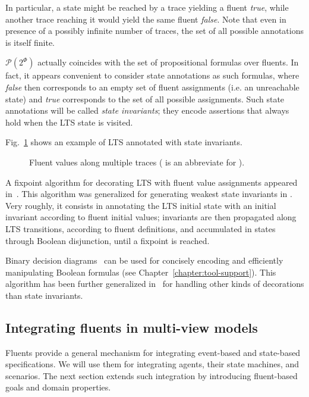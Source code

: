 In particular, a state might be reached by a trace yielding a fluent \emph{true}, while another trace reaching it would yield the same fluent \emph{false}. Note that even in presence of a possibly infinite number of traces, the set of all possible annotations is itself finite. 

$\mathcal{P}(2^\Phi)$ actually coincides with the set of propositional formulas over fluents. In fact, it appears convenient to consider state annotations as such formulas, where \emph{false} then corresponds to an empty set of fluent assignments (i.e. an unreachable state) and \emph{true} corresponds to the set of all possible assignments. Such state annotations will be called \emph{state invariants}; they encode assertions that always hold when the LTS state is visited. 

Fig.~\ref{image:fluent-values-along-multiple-traces} shows an example of LTS annotated with state invariants.

\begin{figure}[H]\centering
{}
\caption[Fluent values along multiple traces]{Fluent values along multiple traces ( is an abbreviate for ).\label{image:fluent-values-along-multiple-traces}}
\end{figure}

A fixpoint algorithm for decorating LTS with fluent value assignments appeared in~\cite{Damas:2005}. This algorithm was generalized for generating weakest state invariants in \cite{Damas:2009}. Very roughly, it consists in annotating the LTS initial state with an initial invariant according to fluent initial values; invariants are then propagated along LTS transitions, according to fluent definitions, and accumulated in states through Boolean disjunction, until a fixpoint is reached. 

Binary decision diagrams~\cite{Bryant:1986} can be used for concisely encoding and efficiently manipulating Boolean formulas (see Chapter~\ref{chapter:tool-support}). This algorithm has been further generalized in~\cite{Damas:2011} for handling other kinds of decorations than state invariants.

\subsection{Integrating fluents in multi-view models}

Fluents provide a general mechanism for integrating event-based and state-based specifications. We will use them for integrating agents, their state machines, and scenarios. The next section extends such integration by introducing fluent-based goals and domain properties.

